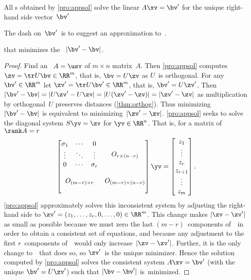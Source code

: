 \begin{theorem} \label{thm:appsol} 
All s obtained by \cref{pro:appsol} solve the linear  \(A\xv=\bv'\) for the unique  right-hand side vector~\(\bv'\) 
\begin{aside} The dash on~\(\bv'\)\ is to suggest an approximation to~\bv. \end{aside}%
that minimizes the ~\(|\bv'-\bv|\).
\end{theorem}
\begin{proof} 
Find an \svd\ \(A=\usv\) of \(m\times n\) matrix~\(A\).
Then \cref{pro:appsol} computes \(\zv=\tr U\bv\in\RR^m\), that is, \(\bv=U\zv\) as \(U\)~is orthogonal.
For any \(\bv'\in\RR^m\) let \(\zv'=\tr U\bv'\in\RR^m\), that is, \(\bv'=U\zv'\).
Then \(|\bv'-\bv|=|U\zv'-U\zv|=|U(\zv'-\zv)|=|\zv'-\zv|\) as multiplication by orthogonal~\(U\) preserves distances (\cref{thm:orthog}).
Thus minimizing~\(|\bv'-\bv|\) is equivalent to minimizing~\(|\zv'-\zv|\).
\cref{pro:appsol} seeks to solve the diagonal system \(S\yv=\zv\) for \(\yv\in\RR^n\). 
That is, for a matrix of \(\rank A=r\)
\begin{equation*}
\begin{bmatrix} \begin{matrix} \sigma_1&\cdots&0\\
\vdots&\ddots&\vdots\\
0&\cdots&\sigma_r \end{matrix} & 
O_{r\times (n-r)}\\\,\\
O_{(m-r)\times r}&O_{(m-r)\times (n-r)}
\\\,\end{bmatrix}\yv
=\begin{bmatrix} z_1\\\vdots\\z_r\\z_{r+1}\\\vdots\\z_m \end{bmatrix}.
\end{equation*}
\cref{pro:appsol} approximately solves this inconsistent system by adjusting the right-hand side to \(\zv'=(z_1,\ldots,z_r,0,\ldots,0)\in\RR^m\).
This change makes \(|\zv-\zv'|\) as small as possible because we must zero the last \((m-r)\)~components of~\zv\ in order to obtain a consistent set of equations, and because any adjustment to the first \(r\)~components of~\zv\ would only increase~\(|\zv-\zv'|\).
Further, it is the only change to~\zv\ that does so, so \(\zv'\)~is the unique minimizer.
Hence the solution computed by \cref{pro:appsol} solves the consistent system \(A\xv=\bv'\) (with the unique \(\bv'=U\zv'\)) such that \(|\bv-\bv'|\) is~minimized.
\end{proof}




